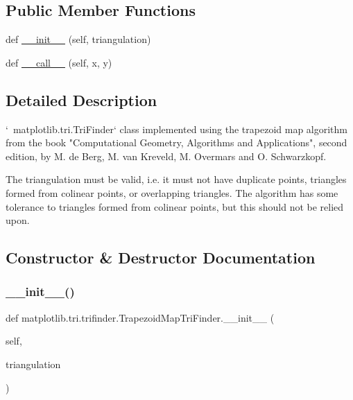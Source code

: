 \subsection*{Public Member Functions}
\begin{DoxyCompactItemize}
\item 
def \hyperlink{classmatplotlib_1_1tri_1_1trifinder_1_1TrapezoidMapTriFinder_aa5fe838a13fad7623b72fb94b9a71b9b}{\+\_\+\+\_\+init\+\_\+\+\_\+} (self, triangulation)
\item 
def \hyperlink{classmatplotlib_1_1tri_1_1trifinder_1_1TrapezoidMapTriFinder_a436a8dc63db017affc274e33c0b706fc}{\+\_\+\+\_\+call\+\_\+\+\_\+} (self, x, y)
\end{DoxyCompactItemize}


\subsection{Detailed Description}
\begin{DoxyVerb}`~matplotlib.tri.TriFinder` class implemented using the trapezoid
map algorithm from the book "Computational Geometry, Algorithms and
Applications", second edition, by M. de Berg, M. van Kreveld, M. Overmars
and O. Schwarzkopf.

The triangulation must be valid, i.e. it must not have duplicate points,
triangles formed from colinear points, or overlapping triangles.  The
algorithm has some tolerance to triangles formed from colinear points, but
this should not be relied upon.
\end{DoxyVerb}
 

\subsection{Constructor \& Destructor Documentation}
\mbox{\label{classmatplotlib_1_1tri_1_1trifinder_1_1TrapezoidMapTriFinder_aa5fe838a13fad7623b72fb94b9a71b9b}} 
\subsubsection{\texorpdfstring{\+\_\+\+\_\+init\+\_\+\+\_\+()}{\_\_init\_\_()}}
{\footnotesize\ttfamily def matplotlib.\+tri.\+trifinder.\+Trapezoid\+Map\+Tri\+Finder.\+\_\+\+\_\+init\+\_\+\+\_\+ (\begin{DoxyParamCaption}\item[{}]{self,  }\item[{}]{triangulation }\end{DoxyParamCaption})}



